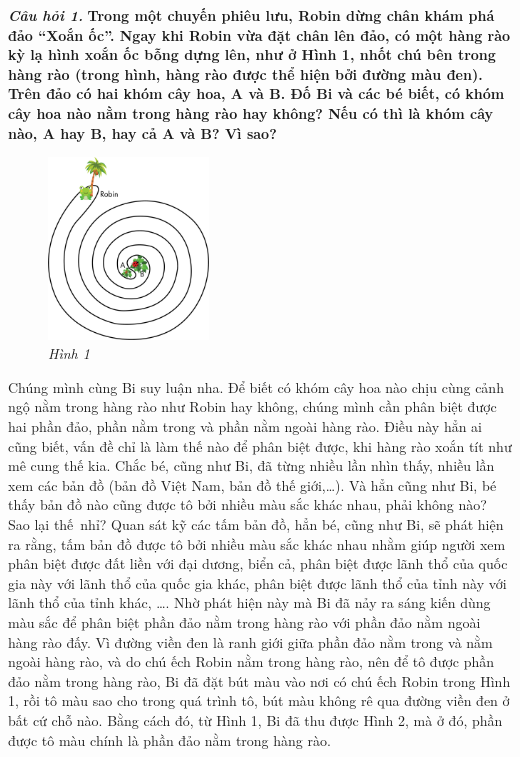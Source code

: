 	\textbf{\textit{Câu hỏi 1.}} {\color{abc}\textbf{Trong một chuyến phiêu lưu,  Robin dừng chân khám phá đảo “Xoắn ốc”. Ngay khi Robin vừa đặt chân lên đảo, có một hàng rào kỳ lạ hình xoắn ốc bỗng dựng lên, như ở Hình 1, nhốt chú bên trong hàng rào (trong hình, hàng rào được thể hiện bởi đường màu đen). Trên đảo có hai khóm cây hoa, $\pmb 
	A$ và $\pmb B$. Đố Bi và các bé biết, có khóm cây hoa nào nằm trong hàng rào hay không? Nếu có thì là khóm cây nào, $\pmb A$ hay $\pmb B$, hay cả $\pmb A$ và $\pmb B$? Vì sao?}}
	\begin{figure}[H]
		\centering
		\vspace*{-5pt}
		\captionsetup{labelformat= empty, justification=centering}
		\includegraphics[width=0.38\textwidth]{1}
		\caption{\small\textit{Hình 1}}
		\vspace*{-10pt}
	\end{figure}
	Chúng mình cùng Bi suy luận nha.
	\vskip 0.1cm
	Để biết có khóm cây hoa nào chịu cùng cảnh ngộ nằm trong hàng rào như Robin hay không, chúng mình cần phân biệt được hai phần đảo, phần nằm trong và phần nằm ngoài hàng rào. Điều này hẳn ai cũng biết, vấn đề chỉ là làm thế nào để phân biệt được, khi hàng rào xoắn tít như mê cung thế kia.
	\vskip 0.1cm
	Chắc bé, cũng như Bi, đã từng nhiều lần nhìn thấy, nhiều lần xem các bản đồ (bản đồ Việt Nam, bản đồ thế giới,\ldots). Và hẳn cũng như Bi, bé thấy bản đồ nào cũng được tô bởi nhiều màu sắc khác nhau, phải không nào? Sao lại thế~nhỉ?
	\vskip 0.1cm
	Quan sát kỹ các tấm bản đồ, hẳn bé, cũng như Bi, sẽ phát hiện ra rằng, tấm bản đồ được tô bởi nhiều màu sắc khác nhau nhằm giúp người xem phân biệt được đất liền với đại dương, biển cả, phân biệt được lãnh thổ của quốc gia này với lãnh thổ của quốc gia khác, phân biệt được lãnh thổ của tỉnh này với lãnh thổ của tỉnh khác, \ldots. Nhờ phát hiện này mà Bi đã nảy ra sáng kiến dùng màu sắc để phân biệt phần đảo nằm trong hàng rào với phần đảo nằm ngoài hàng rào đấy.
	\vskip 0.1cm
	Vì đường viền đen là ranh giới giữa phần đảo nằm trong và nằm ngoài hàng rào, và do chú ếch Robin nằm trong hàng rào, nên để tô được phần đảo nằm trong hàng rào, Bi đã đặt bút màu vào nơi có chú ếch Robin trong Hình 1, rồi tô màu sao cho trong quá trình tô, bút màu không rê qua đường viền đen ở bất cứ chỗ nào. Bằng cách đó, từ Hình 1, Bi đã thu được Hình 2, mà ở đó, phần được tô màu chính là phần đảo nằm trong hàng rào.
